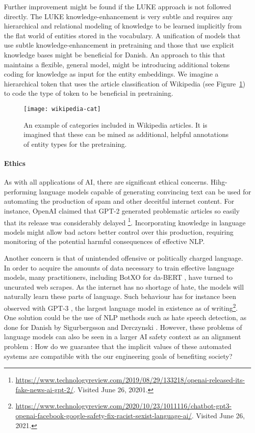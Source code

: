 \documentclass[main.tex]{subfiles}
\begin{document}
Further improvement might be found if the LUKE approach is not followed directly.
The LUKE knowledge-enhancement is very subtle and requires any hierarchical and relational modeling of knowledge to be learned implicitly from the flat world of entities stored in the vocabulary.
A unification of models that use subtle knowledge-enhancement in pretraining and those that use explicit knowledge bases might be beneficial for Danish.
An approach to this that maintains a flexible, general model, might be introducing additional tokens coding for knowledge as input for the entity embeddings.
We imagine a hierarchical token that uses the article classification of Wikipedia (see Figure~\ref{fig:wikipedia-cat}) to code the type of token to be beneficial in pretraining.
\begin{figure}[H]
    \centering
    \texttt{[image: wikipedia-cat]}
    \caption{An example of categories included in Wikipedia articles. It is imagined that these can be mined as additional, helpful annotations of entity types for the pretraining.}
    \label{fig:wikipedia-cat}
\end{figure}\noindent

\paragraph{Ethics}
As with all applications of AI, there are significant ethical concerns.
Hihg-performing language models capable of generating convincing text can be used for automating the production of spam and other deceitful internet content.
For instance, OpenAI claimed that GPT-2 \cite{Radford2019gpt2} generated problematic articles so easily that its release was considerably delayed \footnote{\url{https://www.technologyreview.com/2019/08/29/133218/openai-released-its-fake-news-ai-gpt-2/}. Visited June 26, 20201.}.
Incorporating knowledge in language models might allow bad actors better control over this production, requiring monitoring of the potential harmful consequences of effective NLP.

Another concern is that of unintended offensive or politically charged language.
In order to acquire the amounts of data necessary to train effective language models, many practitioners, including BotXO for da-BERT \cite{botxo2019dabert}, have turned to uncurated web scrapes.
As the internet has no shortage of hate, the models will naturally learn these parts of language.
Such behaviour has for instance been observed with GPT-3 \cite{brown2020language}, the largest language model in existence as of writing\footnote{\url{https://www.technologyreview.com/2020/10/23/1011116/chatbot-gpt3-openai-facebook-google-safety-fix-racist-sexist-language-ai/}. Visited June 26, 2021.}.
One solution could be the use of NLP methods such as hate speech detection, as done for Danish by Sigurbergsson and Derczynski \cite{sigurbergsson-derczynski-2020-offensive}.
However, these problems of language models can also be seen in a larger AI safety context as an alignment problem \cite{taylor2020alignment}:
How do we guarantee that the implicit values of these automated systems are compatible with the our engineering goals of benefiting society?
\end{document}
